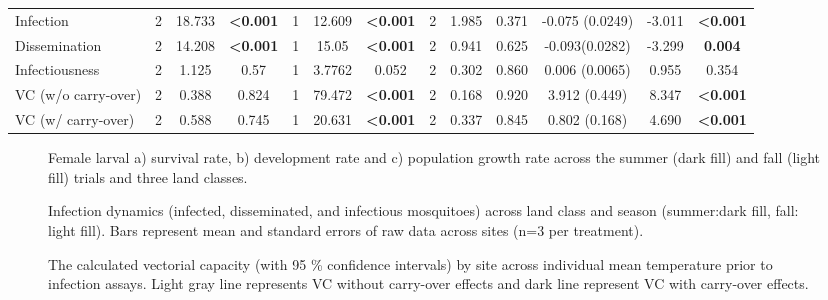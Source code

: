 \documentclass[12pt]{article}
\begin{document}
\begin{landscape}
\begin{table}[]
\begin{tabular}{l|ccc|ccc|ccc|ccc}
Infection                   & 2           & 18.733    & \textbf{\textless0.001} & 1           & 12.609    & \textbf{\textless0.001} & 2           & 1.985     & 0.371                   & -0.075 (0.0249)  & -3.011  & \textbf{\textless0.001} \\
Dissemination               & 2           & 14.208    & \textbf{\textless0.001} & 1           & 15.05     & \textbf{\textless0.001} & 2           & 0.941     & 0.625                   & -0.093(0.0282)   & -3.299  & \textbf{0.004}          \\
Infectiousness              & 2           & 1.125     & 0.57                    & 1           & 3.7762    & 0.052                   & 2           & 0.302     & 0.860                   & 0.006 (0.0065)   & 0.955   & 0.354                   \\
VC (w/o carry-over)         & 2           & 0.388     & 0.824                   & 1           & 79.472    & \textbf{\textless0.001} & 2           & 0.168     & 0.920                   & 3.912 (0.449)    & 8.347   & \textbf{\textless0.001} \\
VC (w/ carry-over)          & 2           & 0.588     & 0.745                   & 1           & 20.631    & \textbf{\textless0.001} & 2           & 0.337     & 0.845                   & 0.802 (0.168)    & 4.690   & \textbf{\textless0.001} \\
\end{tabular}
\end{table}

\end{landscape}

\begin{figure}
\centering
\caption{Female larval a) survival rate, b) development rate and c) population growth rate across the summer (dark fill) and fall (light fill) trials and three land classes.}
\label{fig:growth}
\end{figure}

\begin{figure}
\centering
\caption{Infection dynamics (infected, disseminated, and infectious mosquitoes) across land class and season (summer:dark fill, fall: light fill). Bars represent mean and standard errors of raw data across sites (n=3 per treatment).}
\label{Fig:Infxclass}
\end{figure}

\begin{figure}
\centering
\caption{The calculated vectorial capacity (with 95 \% confidence intervals) by site across individual mean temperature prior to infection assays. Light gray line represents VC without carry-over effects and dark line represent VC with carry-over effects.}
\label{Fig:VC}
\end{figure}
\end{document}
